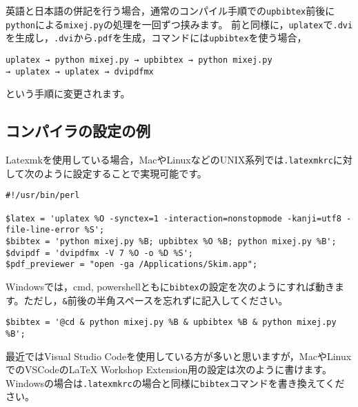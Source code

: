 \documentclass[11pt, a4paper, dvipdfmx, uplatex]{jsarticle}
\begin{document}
英語と日本語の併記を行う場合，通常のコンパイル手順での\texttt{upbibtex}前後に\texttt{python}による\texttt{mixej.py}の処理を一回ずつ挟みます。
前と同様に，\texttt{uplatex}で\texttt{.dvi}を生成し，\texttt{.dvi}から\texttt{.pdf}を生成，\BibTeX コマンドには\texttt{upbibtex}を使う場合，
\begin{center}
\texttt{uplatex → python mixej.py → upbibtex → python mixej.py\\→ uplatex → uplatex → dvipdfmx}
\end{center}
という手順に変更されます。


\subsection{コンパイラの設定の例}

Latexmkを使用している場合，MacやLinuxなどのUNIX系列では\texttt{.latexmkrc}に対して次のように設定することで実現可能です。

\noindent\makebox[\linewidth]{\rule{\linewidth}{0.4pt}}\vspace{-0.5zw}
\begin{lstlisting}[style=onecol]
#!/usr/bin/perl

$latex = 'uplatex %O -synctex=1 -interaction=nonstopmode -kanji=utf8 -file-line-error %S';
$bibtex = 'python mixej.py %B; upbibtex %O %B; python mixej.py %B';
$dvipdf = 'dvipdfmx -V 7 %O -o %D %S';
$pdf_previewer = "open -ga /Applications/Skim.app";
\end{lstlisting}\vspace{-1.8zw}
\noindent\makebox[\linewidth]{\rule{\linewidth}{0.4pt}}\vspace{0.5zw}\par

\noindent
Windowsでは，cmd, powershellともに\texttt{bibtex}の設定を次のようにすれば動きます。ただし，\texttt{\&}前後の半角スペースを忘れずに記入してください。

\noindent\makebox[\linewidth]{\rule{\linewidth}{0.4pt}}\vspace{-0.5zw}
\begin{lstlisting}[style=onecol]
$bibtex = '@cd & python mixej.py %B & upbibtex %B & python mixej.py %B';
\end{lstlisting}\vspace{-1.8zw}
\noindent\makebox[\linewidth]{\rule{\linewidth}{0.4pt}}\vspace{0.5zw}\par


最近ではVisual Studio Codeを使用している方が多いと思いますが，MacやLinuxでのVSCodeのLaTeX Workshop Extension用の設定は次のように書けます。Windowsの場合は\texttt{.latexmkrc}の場合と同様に\texttt{bibtex}コマンドを書き換えてください。
\end{document}
